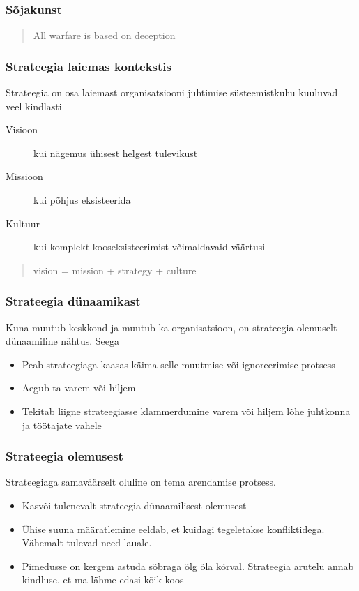 \begin{frame}[fragile]
  \frametitle{Sõjakunst}
  \begin{quote}
    All warfare is based on deception
  \end{quote}

\end{frame}

\begin{frame}[fragile]
  \frametitle{Strateegia laiemas kontekstis}
  Strateegia on osa laiemast organisatsiooni juhtimise süsteemistkuhu kuuluvad veel kindlasti 
  	\begin{description}
		\item[Visioon] kui nägemus ühisest helgest tulevikust
		\item[Missioon] kui põhjus eksisteerida
		\item[Kultuur] kui komplekt kooseksisteerimist võimaldavaid väärtusi
	\end{description}	
	\begin{quote}
	vision = mission + strategy + culture \end{quote}\citep{lipton1996demystifying}
\end{frame}


\begin{frame}[fragile]
  \frametitle{Strateegia dünaamikast}
  Kuna muutub keskkond ja muutub ka organisatsioon, on strateegia olemuselt dünaamiline nähtus. Seega
	\begin{itemize}
		\item Peab strateegiaga kaasas käima selle muutmise või ignoreerimise protsess
		\item Aegub ta varem või hiljem
		\item Tekitab liigne strateegiasse klammerdumine varem või hiljem lõhe juhtkonna ja töötajate vahele
	\end{itemize}
\end{frame}

\begin{frame}[fragile]
  \frametitle{Strateegia olemusest}
  Strateegiaga samaväärselt oluline on tema arendamise protsess. 
	\begin{itemize}
		\item Kasvõi tulenevalt strateegia dünaamilisest olemusest
		\item Ühise suuna määratlemine eeldab, et kuidagi tegeletakse konfliktidega. Vähemalt tulevad need lauale.
		\item Pimedusse on kergem astuda sõbraga õlg õla kõrval. Strateegia arutelu annab kindluse, et ma lähme edasi kõik koos
	\end{itemize}
\end{frame}

